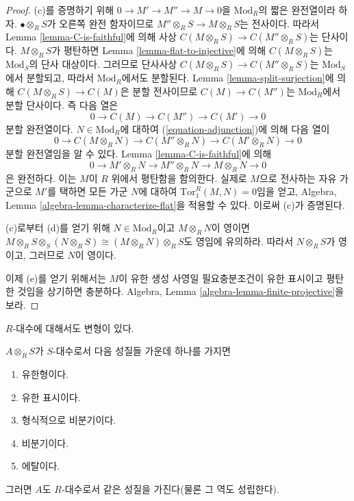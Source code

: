 \begin{proof}
\medskip\noindent
(c)를 증명하기 위해 $0 \to M' \to M'' \to M \to 0$을
$\text{Mod}_R$의 짧은 완전열이라 하자. $\bullet \otimes_R S$가 오른쪽
완전 함자이므로 $M'' \otimes_R S \to M \otimes_R S$는 전사이다. 따라서
Lemma \ref{lemma-C-is-faithful}에 의해 사상
$C(M \otimes_R S) \to C(M'' \otimes_R S)$는 단사이다.
$M \otimes_R S$가 평탄하면 Lemma \ref{lemma-flat-to-injective}에 의해
$C(M \otimes_R S)$는 $\text{Mod}_S$의 단사 대상이다. 그러므로 단사사상
$C(M \otimes_R S) \to C(M'' \otimes_R S)$는 $\text{Mod}_S$에서 분할되고,
따라서 $\text{Mod}_R$에서도 분할된다. Lemma
\ref{lemma-split-surjection}에 의해
$C(M \otimes_R S) \to C(M)$은 분할 전사이므로
$C(M) \to C(M'')$는 $\text{Mod}_R$에서 분할 단사이다. 즉 다음 열은
$$
0 \to C(M) \to C(M'') \to C(M') \to 0
$$
분할 완전열이다. $N \in \text{Mod}_R$에 대하여
(\ref{equation-adjunction})에 의해 다음 열이
$$
0 \to C(M \otimes_R N) \to C(M'' \otimes_R N) \to C(M' \otimes_R N) \to 0
$$
분할 완전열임을 알 수 있다. Lemma \ref{lemma-C-is-faithful}에 의해
$$
0 \to M' \otimes_R N \to M'' \otimes_R N \to M \otimes_R N \to 0
$$
은 완전하다. 이는 $M$이 $R$ 위에서 평탄함을 함의한다. 실제로 $M$으로
전사하는 자유 가군으로 $M'$를 택하면 모든 가군 $N$에 대하여
$\text{Tor}_1^R(M, N) = 0$임을 얻고, Algebra, Lemma
\ref{algebra-lemma-characterize-flat}을 적용할 수 있다. 이로써 (c)가
증명된다.

\medskip\noindent
(c)로부터 (d)를 얻기 위해 $N \in \text{Mod}_R$이고 $M \otimes_R N$이
영이면
$M \otimes_R S \otimes_S (N \otimes_R S) \cong (M \otimes_R N) \otimes_R
S$도 영임에 유의하라. 따라서 $N \otimes_R S$가 영이고, 그러므로
$N$이 영이다.

\medskip\noindent
이제 (e)를 얻기 위해서는 $M$이 유한 생성 사영일 필요충분조건이 유한
표시이고 평탄한 것임을 상기하면 충분하다. Algebra, Lemma
\ref{algebra-lemma-finite-projective}을 보라.
\end{proof}

\noindent
$R$-대수에 대해서도 변형이 있다.

\begin{theorem}
\label{theorem-descend-algebra-properties}
$A \otimes_R S$가 $S$-대수로서 다음 성질들 가운데 하나를 가지면
\begin{enumerate}
\item[(a)]
유한형이다.
\item[(b)]
유한 표시이다.
\item[(c)]
형식적으로 비분기이다.
\item[(d)]
비분기이다.
\item[(e)]
에탈이다.
\end{enumerate}
그러면 $A$도 $R$-대수로서 같은 성질을 가진다(물론 그 역도 성립한다).
\end{theorem}

